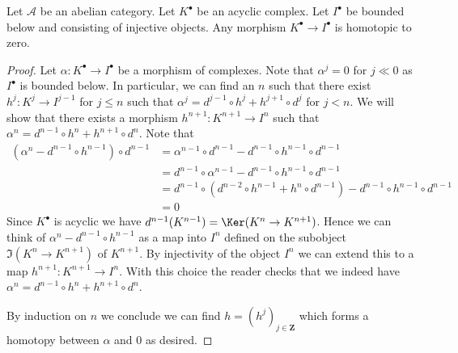 \begin{lemma}
\label{lemma-acyclic-is-zero}
Let $\mathcal{A}$ be an abelian category.
Let $K^\bullet$ be an acyclic complex.
Let $I^\bullet$ be bounded below and consisting of injective objects.
Any morphism $K^\bullet \to I^\bullet$ is homotopic to zero.
\end{lemma}

\begin{proof}
Let $\alpha : K^\bullet \to I^\bullet$ be a morphism of
complexes. Note that $\alpha^j = 0$ for $j \ll 0$ as $I^\bullet$
is bounded below. In particular, we can find an $n$ such that
there exist $h^j :  K^j \to I^{j - 1}$ for $j \leq n$ such that
$\alpha^j = d^{j - 1} \circ h^j + h^{j + 1} \circ d^j$
for $j < n$. We will show that there exists a morphism
$h^{n + 1} : K^{n + 1} \to I^n$
such that $\alpha^n = d^{n - 1} \circ h^n + h^{n + 1} \circ d^n$.
Note that
\begin{align*}
(\alpha^n - d^{n - 1} \circ h^{n - 1}) \circ d^{n - 1}
& =
\alpha^{n - 1} \circ d^{n - 1} - d^{n - 1} \circ h^{n - 1} \circ d^{n - 1} \\
& =
d^{n - 1} \circ \alpha^{n - 1} - d^{n - 1} \circ h^{n - 1} \circ d^{n - 1} \\
& =
d^{n - 1} \circ (d^{n - 2} \circ h^{n - 1} + h^n \circ d^{n - 1})
- d^{n - 1} \circ h^{n - 1} \circ d^{n - 1} \\
& = 0
\end{align*}
Since $K^\bullet$ is acyclic we have
$d^{n - 1}(K^{n - 1}) = \Ker(K^n \to K^{n + 1})$.
Hence we can think of $\alpha^n -  d^{n - 1} \circ h^{n - 1}$
as a map into $I^n$ defined on the subobject $\Im(K^n \to K^{n + 1})$
of $K^{n + 1}$. By injectivity of the object $I^n$ we can extend this to
a map $h^{n + 1} : K^{n + 1} \to I^n$. With this choice the reader
checks that we indeed have
$\alpha^n = d^{n - 1} \circ h^n + h^{n + 1} \circ d^n$.

\medskip\noindent
By induction on $n$ we conclude we can find $h  = (h^j)_{j \in \mathbf{Z}}$
which forms a homotopy between $\alpha$ and $0$ as desired.
\end{proof}

